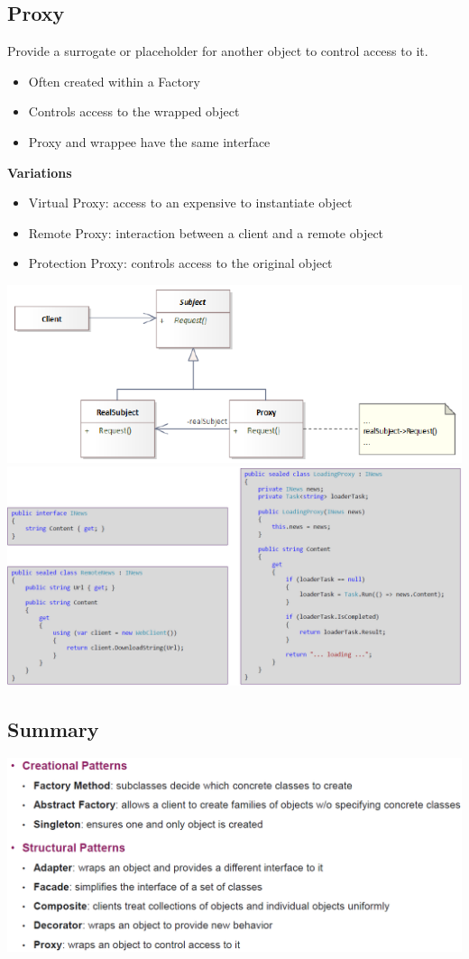 \subsection{Proxy}
Provide a surrogate or placeholder for another object to control access to it.\\
\begin{itemize}
    \item Often created within a Factory
    \item Controls access to the wrapped object
    \item Proxy and wrappee have the same interface
\end{itemize}
\textbf{Variations}
\begin{itemize}
    \item Virtual Proxy: access to an expensive to instantiate object
    \item Remote Proxy: interaction between a client and a remote object
    \item Protection Proxy: controls access to the original object
\end{itemize}
\includegraphics[width=0.8\linewidth]{../img/proxy_pattern.png}
\includegraphics[width=\linewidth]{../img/proxy_pattern_code.png}

\subsection{Summary}
\includegraphics[width=\linewidth]{../img/patterns_summary.png}


